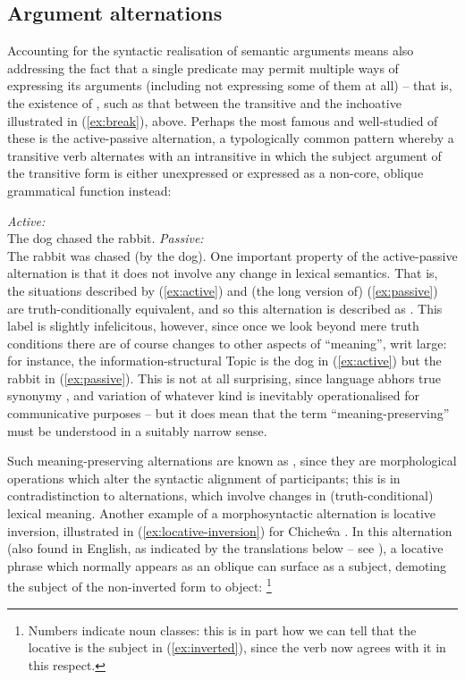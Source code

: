\documentclass[output=paper]{langscibook}
\begin{document}
\subsection{Argument alternations}
\label{sec:argstr:arg-alternations}

Accounting for the syntactic realisation of semantic arguments means also
addressing the fact that a single predicate may permit multiple ways of
expressing its arguments (including not expressing some of them at all) -- that
is, the existence of , such as that between the
transitive and the inchoative illustrated in (\ref{ex:break}), above. Perhaps
the most famous and well-studied of these is the active-passive alternation, a
typologically common pattern whereby a transitive verb alternates with an
intransitive in which the subject argument of the transitive form is either
unexpressed or expressed as a non-core, oblique grammatical function instead:

\ea\label{ex:active-passive}%
\ea\label{ex:active}%
\emph{Active:}\\
The dog chased the rabbit.%
%
\ex\label{ex:passive}%
\emph{Passive:}\\
The rabbit was chased (by the dog).
\z
\z
%
One important property of the active-passive alternation is that it does not
involve any change in lexical semantics. That is, the situations described by
(\ref{ex:active}) and (the long version of) (\ref{ex:passive}) are
truth-conditionally equivalent, and so this alternation is described as
 \citep[cf.][]{SadlerSpencer1998}. This label is slightly
infelicitous, however, since once we look beyond mere truth conditions there are
of course changes to other aspects of ``meaning'', writ large: for instance, the
information-structural Topic is the dog in (\ref{ex:active}) but the rabbit in
(\ref{ex:passive}). This is not at all surprising, since language
abhors true synonymy \citep{cruse1986, Goldberg2019}, and variation of whatever
kind is inevitably operationalised for communicative purposes
\citep{clark1987contrast,eckert2018meaning} -- but it does mean that
the term ``meaning-preserving'' must be understood in a suitably narrow sense.

Such meaning-preserving alternations are known as , since
they are morphological operations which alter the syntactic alignment of
participants; this is in contradistinction to  alternations,
which involve changes in (truth-conditional) lexical meaning. Another example of
a morphosyntactic alternation is locative inversion, illustrated in
(\ref{ex:locative-inversion}) for Chiche\^{w}a \citep[2]{bresnan1989locative}.
In this alternation (also found in English, as indicated by the translations
below -- see \citealt{Bresnan:Architecture}), a locative phrase which normally
appears as an oblique can surface as a subject, demoting the subject of the
non-inverted form to object:%
%
\footnote{Numbers indicate noun classes: this is in part how we can tell that
  the locative is the subject in (\ref{ex:inverted}), since the verb
  now agrees with it in this respect.}
%
\end{document}
